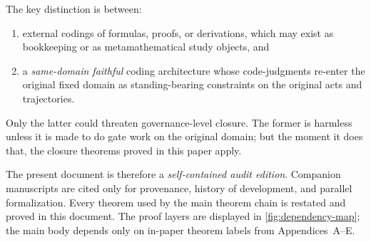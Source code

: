 \documentclass[11pt]{article}
\theoremstyle{plain}
\theoremstyle{definition}
\begin{document}
The key distinction is between:
\begin{enumerate}[label=(\alph*)]
    \item external codings of formulas, proofs, or derivations, which may exist as bookkeeping or as metamathematical study objects, and
    \item a \emph{same-domain faithful} coding architecture whose code-judgments re-enter the original fixed domain as standing-bearing constraints on the original acts and trajectories.
\end{enumerate}
Only the latter could threaten governance-level closure. The former is harmless unless it is made to do gate work on the original domain; but the moment it does that, the closure theorems proved in this paper apply.

The present document is therefore a \emph{self-contained audit edition}. Companion manuscripts are cited only for provenance, history of development, and parallel formalization. Every theorem used by the main theorem chain is restated and proved in this document. The proof layers are displayed in \cref{fig:dependency-map}; the main body depends only on in-paper theorem labels from Appendices~A--E.
\end{document}

